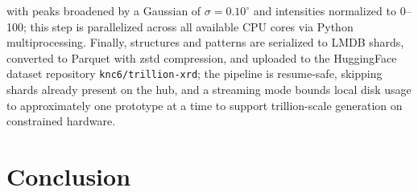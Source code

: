 \documentclass[pdflatex,sn-mathphys-num]{sn-jnl}
\theoremstyle{thmstyleone}
\theoremstyle{thmstyletwo}
\theoremstyle{thmstylethree}
\begin{document}
  with peaks broadened by a Gaussian of $\sigma = 0.10^\circ$ and intensities                                                                                                     
  normalized to 0--100; this step is parallelized across all available CPU cores                                                                                                  
  via Python multiprocessing. Finally, structures and patterns are serialized to                                                                                                  
  LMDB shards, converted to Parquet with zstd compression, and uploaded to the                                                                                                    
  HuggingFace dataset repository \texttt{knc6/trillion-xrd}; the pipeline is                                                                                                      
  resume-safe, skipping shards already present on the hub, and a streaming mode                                                                                                   
  bounds local disk usage to approximately one prototype at a time to support                                                                                                     
  trillion-scale generation on constrained hardware.




\section{Conclusion}\label{sec:conclusion}
\end{document}
